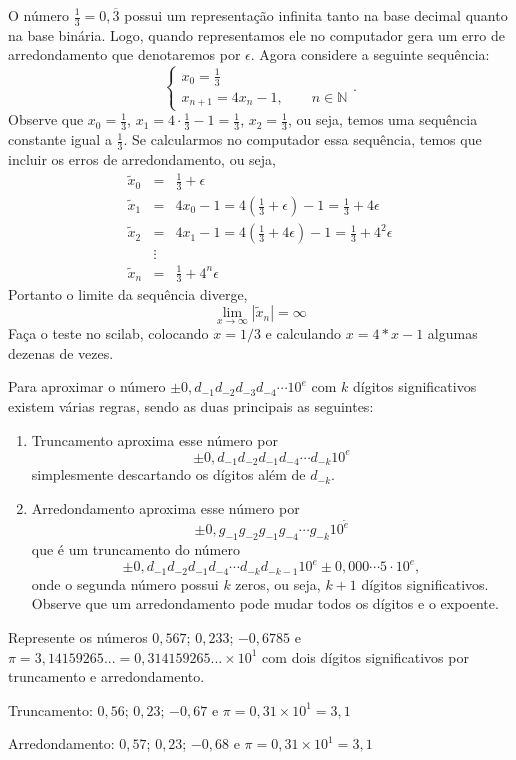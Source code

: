 \begin{ex}
O número $\frac{1}{3}=0,\overline{3}$ possui um representação infinita tanto na base decimal quanto na base binária. Logo, quando representamos ele no computador gera um erro de arredondamento que denotaremos por $\epsilon$. Agora considere a seguinte sequência:
$$
\left\{\begin{array}{l}
x_0=\frac{1}{3}\\
x_{n+1}=4x_n-1,\qquad n\in\mathbb{N}
\end{array}\right..
$$
Observe que $x_0=\frac{1}{3}$, $x_1=4\cdot \frac{1}{3}-1=\frac{1}{3}$, $x_2=\frac{1}{3}$, ou seja, temos uma sequência constante igual a $\frac{1}{3}$. Se calcularmos no computador essa sequência, temos que incluir os erros de arredondamento, ou seja,
\begin{eqnarray*}
\tilde{x}_0&=&\frac{1}{3}+\epsilon\\
\tilde{x}_1&=&4x_0-1=4\left(\frac{1}{3}+\epsilon\right)-1=\frac{1}{3}+4\epsilon\\
\tilde{x}_2&=&4x_1-1=4\left(\frac{1}{3}+4\epsilon\right)-1=\frac{1}{3}+4^2\epsilon\\
&\vdots&\\
\tilde{x}_n&=&\frac{1}{3}+4^n\epsilon
\end{eqnarray*}
Portanto o limite da sequência diverge,
$$
\lim_{x\to\infty}|\tilde{x}_n|=\infty
$$
Faça o teste no scilab, colocando $x=1/3$ e calculando $x=4*x-1$ algumas dezenas de vezes.
\end{ex}

Para aproximar o número $\pm 0,d_{-1}d_{-2}d_{-3}d_{-4}\cdots 10^e$ com $k$ dígitos significativos existem várias regras, sendo as duas principais as seguintes:
\begin{enumerate}
\item Truncamento aproxima esse número por
$$
\pm 0,d_{-1}d_{-2}d_{-1}d_{-4}\cdots d_{-k} 10^e
$$
simplesmente descartando os dígitos além de $d_{-k}$.
\item Arredondamento aproxima esse número por
$$
\pm 0,g_{-1}g_{-2}g_{-1}g_{-4}\cdots g_{-k} 10^{\tilde{e}}
$$
que é um truncamento do número
$$
\pm 0,d_{-1}d_{-2}d_{-1}d_{-4}\cdots d_{-k}d_{-k-1} 10^e \pm 0,000\cdots 5\cdot 10^e,
$$
onde o segunda número possui $k$ zeros, ou seja, $k+1$ dígitos significativos. Observe que um arredondamento pode mudar todos os dígitos e o expoente.
\end{enumerate}

\begin{ex} Represente os números $0,567$; $0,233$; $-0,6785$ e $\pi =3,14159265...=0,314159265...\times 10^1$ com dois dígitos significativos por truncamento e arredondamento.

Truncamento: $0,56$; $0,23$; $-0,67$ e $\pi =0,31\times 10^1=3,1$

Arredondamento: $0,57$; $0,23$; $-0,68$ e $\pi =0,31\times 10^1=3,1$
\end{ex}

